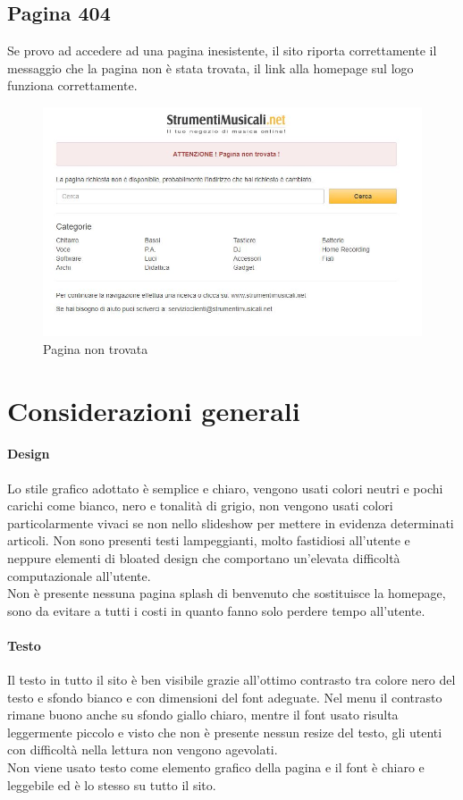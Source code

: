 \documentclass[12pt]{article}
\begin{document}
	\subsection{Pagina 404}
	\vspace{0.5cm}
	Se provo ad accedere ad una pagina inesistente, il sito riporta correttamente il messaggio che la pagina non è stata trovata, il link alla homepage sul logo funziona correttamente.
	\begin{figure}[ht!]
		\centering	
		\includegraphics[width=180mm]{images/404.jpg}
		\caption{Pagina non trovata}
	\end{figure}
	\newpage
	\section{Considerazioni generali}
	\vspace{0.5cm}
	\paragraph{Design} Lo stile grafico adottato è semplice e chiaro, vengono usati colori neutri e pochi carichi come bianco, nero e tonalità di grigio, non vengono usati colori particolarmente vivaci se non nello slideshow per mettere in evidenza determinati articoli. Non sono presenti testi lampeggianti, molto fastidiosi all'utente e neppure elementi di bloated design che comportano un'elevata difficoltà computazionale all'utente. \\
	Non è presente nessuna pagina splash di benvenuto che sostituisce la homepage, sono da evitare a tutti i costi in quanto fanno solo perdere tempo all'utente. 
	\\
	\paragraph{Testo} Il testo in tutto il sito è ben visibile grazie all'ottimo contrasto tra colore nero del testo e sfondo bianco e con dimensioni del font adeguate. Nel menu il contrasto rimane buono anche su sfondo giallo chiaro, mentre il font usato risulta leggermente piccolo e visto che non è presente nessun resize del testo,  gli utenti con difficoltà nella lettura non vengono agevolati. 
	\\Non viene usato testo come elemento grafico della pagina e il font è chiaro e leggebile ed è lo stesso su tutto il sito.
	\\
\end{document}
